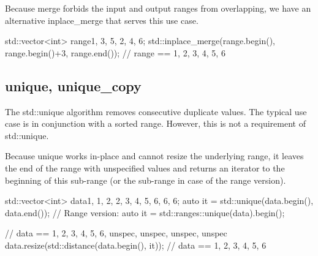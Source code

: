 

Because merge forbids the input and output ranges from overlapping, we have an alternative inplace\_merge that serves this use case.

\begin{box-note}
\begin{cppcode}
std::vector<int> range{1, 3, 5, 2, 4, 6};
std::inplace_merge(range.begin(), range.begin()+3, range.end());
// range == { 1, 2, 3, 4, 5, 6 }
\end{cppcode}
\end{box-note}

\subsection{unique, unique\_copy}

The std::unique algorithm removes consecutive duplicate values. The typical use case is in conjunction with a sorted range. However, this is not a requirement of std::unique.



Because unique works in-place and cannot resize the underlying range, it leaves the end of the range with unspecified values and returns an iterator to the beginning of this sub-range (or the sub-range in case of the range version).

\begin{box-note}
\begin{cppcode}
std::vector<int> data{1, 1, 2, 2, 3, 4, 5, 6, 6, 6};
auto it = std::unique(data.begin(), data.end());
// Range version: auto it = std::ranges::unique(data).begin();

// data == {1, 2, 3, 4, 5, 6, unspec, unspec, unspec, unspec}
data.resize(std::distance(data.begin(), it));
// data == {1, 2, 3, 4, 5, 6}
\end{cppcode}
\end{box-note}




